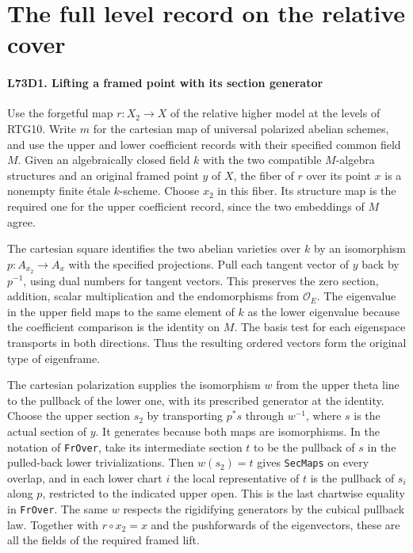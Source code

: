 \section{The full level record on the relative cover}

\paragraph{L73D1. Lifting a framed point with its section generator}
Use the forgetful map $r:X_2\to X$ of the relative higher model at
the levels of RTG10. Write $m$ for the cartesian map of universal
polarized abelian schemes, and use the upper and lower coefficient
records with their specified common field $M$. Given an algebraically
closed field $k$ with the two compatible $M$-algebra structures and
an original framed point $y$ of $X$, the fiber of $r$ over its point
$x$ is a nonempty finite \'etale $k$-scheme. Choose $x_2$ in this
fiber. Its structure map is the required one for the upper
coefficient record, since the two embeddings of $M$ agree.

The cartesian square identifies the two abelian varieties over $k$
by an isomorphism $p:A_{x_2}\to A_x$ with the specified projections.
Pull each tangent vector of $y$ back by $p^{-1}$, using dual numbers
for tangent vectors. This preserves the zero section, addition,
scalar multiplication and the endomorphisms from $\mathcal O_E$.
The eigenvalue in the upper field maps to the same element of $k$
as the lower eigenvalue because the coefficient comparison is the
identity on $M$. The basis test for each eigenspace transports in both
directions. Thus the resulting ordered vectors form the original type
of eigenframe.

The cartesian polarization supplies the isomorphism $w$ from the
upper theta line to the pullback of the lower one, with its prescribed
generator at the identity. Choose the upper section $s_2$ by transporting
$p^*s$ through $w^{-1}$, where $s$ is the actual section of $y$.
It generates because both maps are isomorphisms. In the notation
of \texttt{FrOver}, take its intermediate section $t$ to be the
pullback of $s$ in the pulled-back lower trivializations. Then
$w(s_2)=t$ gives \texttt{SecMaps} on every overlap, and in each
lower chart $i$ the local representative of $t$ is the pullback
of $s_i$ along $p$, restricted to the indicated upper open. This is
the last chartwise equality in \texttt{FrOver}. The same $w$
respects the rigidifying generators by the cubical pullback law.
Together with $r\circ x_2=x$ and the
pushforwards of the eigenvectors, these are all the fields of the
required framed lift.

